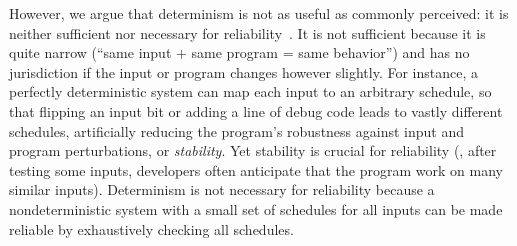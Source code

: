 However, we argue that determinism is not as useful as commonly perceived:
it is neither sufficient nor necessary for
reliability~\cite{smt:hotpar13,smt:cacm}.  It is not sufficient because it
is quite narrow (``same input + same program = same behavior'') and has no
jurisdiction if the input or program changes however slightly.  For
instance, a perfectly deterministic system can map each input to an
arbitrary schedule, so that flipping
an input bit or adding a line of debug code leads to vastly different schedules,
artificially reducing the program's robustness against input and program
perturbations, or \emph{stability}.  Yet stability is crucial
for reliability (\eg, after testing some inputs, developers often anticipate that the program work on many similar inputs). Determinism is not necessary for
reliability because a nondeterministic system with a small set of
schedules for all inputs can be made reliable by exhaustively checking all
schedules.





